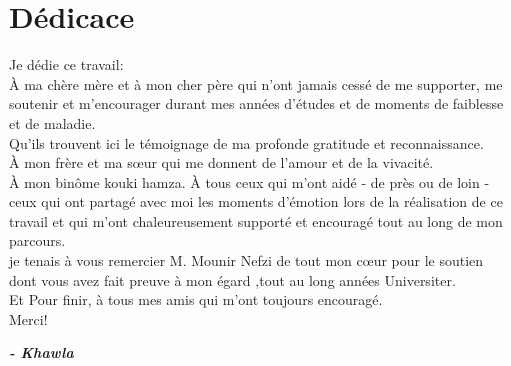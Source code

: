 \chapter*{Dédicace}

\begin{fquote}
\begin{center}
\large{
Je dédie ce travail:\\
\uppercase{à} ma chère mère et à mon cher père qui n'ont jamais cessé de me supporter, me soutenir et m'encourager durant mes années d'études et de moments de faiblesse et de maladie.\\
Qu'ils trouvent ici le témoignage de ma profonde gratitude et reconnaissance.
\\
\uppercase{à} mon frère et ma sœur qui me donnent de l'amour et de la vivacité.
\\
\uppercase{à} mon binôme kouki hamza.
\uppercase{à} tous ceux qui m'ont aidé - de près ou de loin - ceux qui ont partagé avec moi les moments d'émotion lors de la réalisation de ce travail et qui m'ont chaleureusement supporté et encouragé tout au long de mon parcours.\\
je tenais à vous remercier M. Mounir Nefzi de tout mon cœur pour le soutien dont vous avez fait preuve à mon égard ,tout au long années Universiter.\\

\uppercase{E}t Pour finir, à tous mes amis qui m'ont toujours encouragé.\\
Merci!
}
\end{center}
\bigskip
\medskip
\end{fquote}

\begin{adjustwidth}{2cm}{1cm}
\hspace*{\fill} \textbf{\textit{\large{- Khawla}}}
\end{adjustwidth}

\clearpage